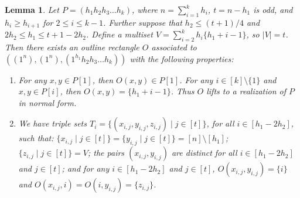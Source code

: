 \documentclass{sn-jnl}
\newtheorem{lemma}[theorem]{Lemma}
\theoremstyle{definition}
\begin{document}
\begin{lemma}
\label{circulant_construction}
    Let $P=(h_1h_2h_3\dots h_k)$, where $n=\sum_{i=1}^k h_i$, $t=n-h_1$ is odd, and $h_i\ge h_{i+1}$ for $2\le i \le k-1$. Further suppose that $h_2 \le (t+1)/4$ and $2h_2 \le h_1 \le t+1-2h_2$.
    Define a multiset $V = \sum_{i=2}^k h_i\{h_1+i-1\}$, so $|V|=t$.
    Then there exists an outline rectangle $O$ associated to $((1^n), (1^n), (1^{h_1}h_2h_3\dots h_k))$ with the following properties:
    \begin{enumerate}
        \item For any $x,y \in P[1]$, then $O(x,y)\in P[1]$. For any
        $i \in [k]\setminus \{1\}$ and $x,y \in P[i]$, then $O(x,y)=\{h_1+i-1\}$. Thus $O$ lifts to a realization of $P$ in normal form.
        \item We have triple sets $T_i=\{(x_{i,j},y_{i,j},z_{i,j}) \mid j\in [t]\}$, for all $i\in [h_1-2h_2]$, such that: $\{x_{i,j} \mid j\in [t]\}=\{y_{i,j} \mid j\in [t]\} =  [n]\setminus [h_1]$; $\{z_{i,j} \mid j\in [t]\}=V$; the pairs $(x_{i,j},y_{i,j})$ are distinct for all $i\in [h_1-2h_2]$ and $j \in [t]$; and for any $i\in [h_1-2h_2]$ and $j \in [t]$, $O(x_{i,j},y_{i,j})=\{i\}$ and $O(x_{i,j},i)=O(i,y_{i,j})=\{z_{i,j}\}$.
    \end{enumerate}
\end{lemma}
\end{document}
